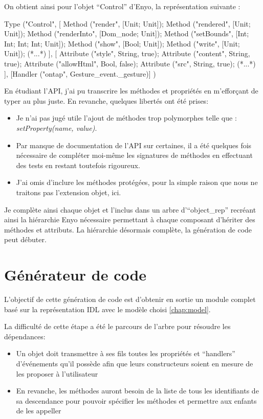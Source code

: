 \documentclass[11pt,a4paper]{report}
\begin{document}
On obtient ainsi pour l'objet ``Control'' d'Enyo, la représentation suivante :

\begin{OCaml}
Type ("Control",
      [
	Method ("render", [Unit; Unit]);
	Method ("rendered", [Unit; Unit]);
	Method ("renderInto", [Dom_node; Unit]);
	Method ("setBounds", [Int; Int; Int; Int; Unit]);
	Method ("show", [Bool; Unit]);
	Method ("write", [Unit; Unit]);
        (*...*)
      ],
      [
	Attribute ("style", String, true);
	Attribute ("content", String, true);
	Attribute ("allowHtml", Bool, false);
	Attribute ("src", String, true);
        (*...*)
      ],
      [Handler ("ontap", Gesture_event._gesture)]
)
\end{OCaml}

En étudiant l'API, j'ai pu transcrire les méthodes et propriétés en m'efforçant de typer au plus juste.
En revanche, quelques libertés ont été prises:
\begin{itemize}
\item Je n'ai pas jugé utile l'ajout de méthodes trop polymorphes telle que : \emph{setProperty(name, value)}.
\item Par manque de documentation de l'API sur certaines, il a été quelques fois nécessaire de compléter 
  moi-même les signatures de méthodes en effectuant des tests en restant toutefois rigoureux.  
\item J'ai omis d'inclure les méthodes protégées, pour la simple raison que nous ne traitons pas
  l'extension objet, ici.
\end{itemize}\medskip

Je complète ainsi chaque objet et l'inclus dans un arbre d'``object\_rep'' recréant ainsi la hiérarchie
Enyo nécessaire permettant à chaque composant d'hériter des méthodes et attributs.
La hiérarchie désormais complète, la génération de code peut débuter.

\section{Générateur de code}

L'objectif de cette génération de code est d'obtenir en sortie un module complet basé sur la représentation
IDL avec le modèle choisi \ref{chap:model}.

La difficulté de cette étape a été le parcours de l'arbre pour résoudre les dépendances:
\begin{itemize}
\item Un objet doit transmettre à ses fils toutes les propriétés et ``handlers'' d'événements 
  qu'il possède afin que leurs constructeurs soient en mesure de les proposer à l'utilisateur
\item En revanche, les méthodes auront besoin de la liste de tous les identifiants de sa descendance pour
  pouvoir spécifier les méthodes et permettre aux enfants de les appeller
\end{itemize}\smallskip
\end{document}
